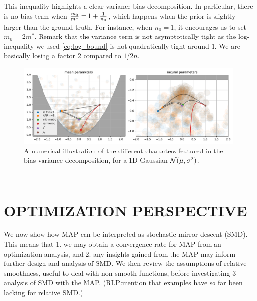 \documentclass[twoside]{article}
\let\oldsection\section
\renewcommand{\section}[1]{\oldsection{\texorpdfstring{\uppercase{#1}}{#1}}}
\newcommand{\rlp}[1]{\textcolor{BrickRed}{(RLP:#1)}}
\newcommand{\m}{m}
\begin{document}
This inequality highlights a clear variance-bias decomposition.
In particular, there is no bias term when $\frac{\m_0}{\m^*} =1 + \inv{n_0} $, which happens when the prior is slightly larger than the ground truth.  For instance, when $n_0=1$, it encourages us to set $\m_0 = 2 \m^*$.
Remark that the variance term is not asymptotically tight as the log-inequality we used \eqref{eq:log_bound} is not quadratically tight around $1$. We are basically losing a factor 2 compared to $1/2n$.


\begin{figure}[t]
	\centering
	\includegraphics[width=\textwidth]{figs/thales/numerical_schema_n=3.pdf}
	\caption{A numerical illustration of the different characters featured in the bias-variance decomposition, for a 1D Gaussian ${\mathcal N}(\mu, \sigma^2)$.}
	\label{fig:bias-variance-numerical}
\end{figure}






\newpage~\null\\
\FloatBarrier

\section{Optimization Perspective}
\label{sec:optimization}

We now show how MAP can be interpreted as stochastic mirror descent (SMD).
This means that 1. we may obtain a convergence rate for MAP from an optimization analysis, and 2. any insights gained from the MAP may inform further design and analysis of SMD.
We then review the assumptions of relative smoothness, useful to deal with non-smooth functions, before investigating 3 analysis of SMD with the MAP.
\rlp{mention that examples have so far been lacking for relative SMD.}
\end{document}
